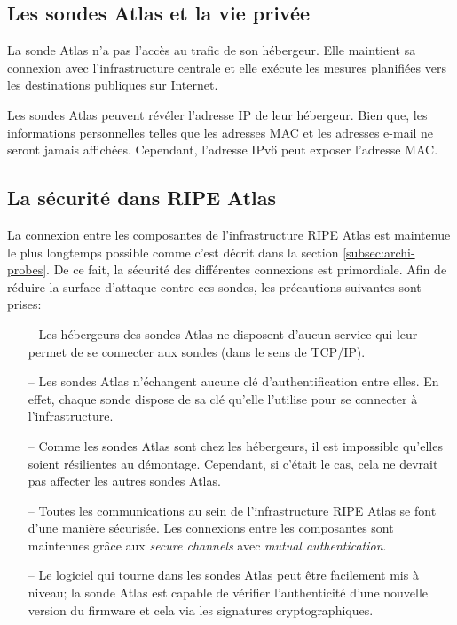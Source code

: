 \subsection{Les sondes  Atlas et la vie privée}
La sonde  Atlas n'a pas l'accès au trafic de son hébergeur. Elle maintient sa connexion avec l'infrastructure centrale et elle exécute les mesures planifiées vers les destinations publiques sur Internet. 

Les sondes  Atlas peuvent révéler l'adresse IP de leur hébergeur. Bien que, les informations personnelles telles que les adresses MAC et les adresses e-mail ne seront jamais affichées. Cependant, l'adresse IPv6 peut exposer l'adresse MAC. 

\subsection{La sécurité dans RIPE Atlas}

La connexion entre les composantes de l'infrastructure RIPE Atlas est maintenue le plus longtemps possible comme c'est décrit dans  la section \ref{subsec:archi-probes}. De ce fait, la sécurité des différentes connexions est primordiale. Afin de réduire la surface d'attaque contre ces sondes, les précautions suivantes sont prises:

\begin{itemize}
	\item[--] Les  hébergeurs des sondes  Atlas ne disposent d'aucun service qui leur permet de se connecter aux sondes (dans le sens de TCP/IP).
	\item[--] Les sondes   Atlas n'échangent aucune clé d'authentification entre elles. En effet, chaque sonde dispose de sa clé qu'elle l'utilise pour se connecter à l'infrastructure.
	\item[--] Comme les sondes  Atlas sont chez les hébergeurs, il est impossible qu'elles soient résilientes au démontage. Cependant, si c'était le cas, cela ne devrait pas affecter les autres sondes  Atlas.
	\item[--] Toutes les communications au sein de l'infrastructure RIPE Atlas se font d'une manière sécurisée. Les connexions entre les composantes sont maintenues grâce aux \textit{secure channels} avec \textit{mutual authentication}.
	\item[--] Le logiciel qui tourne dans les sondes  Atlas peut être facilement mis à niveau; la sonde  Atlas est capable de vérifier l'authenticité d'une nouvelle version du firmware et cela via les signatures cryptographiques. 
\end{itemize}

